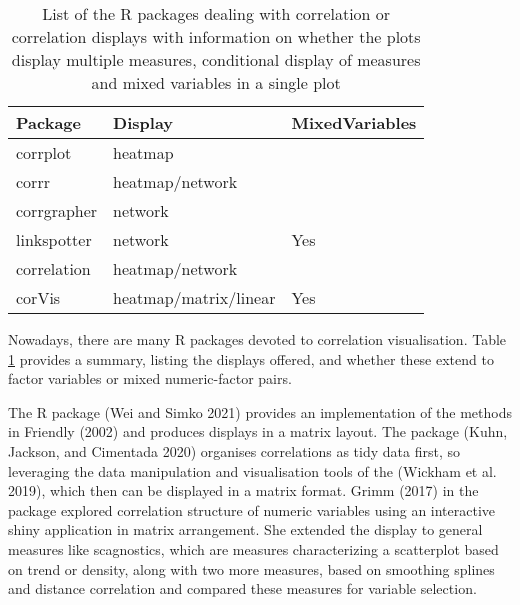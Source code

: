 \begin{table}

\caption{\label{tab:corrdisplay-packages}List of the R packages dealing with correlation or correlation displays with information on whether the plots display multiple measures, conditional display of measures and mixed variables in a single plot}
\centering
\begin{tabular}[t]{lll}
\toprule
Package & Display & MixedVariables\\
\midrule
corrplot & heatmap & \\
corrr & heatmap/network & \\
corrgrapher & network & \\
linkspotter & network & Yes\\
correlation & heatmap/network & \\
\addlinespace
corVis & heatmap/matrix/linear & Yes\\
\bottomrule
\end{tabular}
\end{table}

Nowadays, there are many R packages devoted to correlation visualisation. Table \ref{tab:corrdisplay-packages} provides a summary, listing the displays offered, and whether these extend to factor variables or mixed numeric-factor pairs.

The R package  (Wei and Simko 2021) provides an implementation of the methods in Friendly (2002) and produces displays in a matrix layout. The package  (Kuhn, Jackson, and Cimentada 2020) organises correlations as tidy data first, so leveraging the data manipulation and visualisation tools of the  (Wickham et al. 2019), which then can be displayed in a matrix format. Grimm (2017) in the package  explored correlation structure of numeric variables using an interactive shiny application in matrix arrangement. She extended the display to general measures like scagnostics, which are measures characterizing a scatterplot based on trend or density, along with two more measures, based on smoothing splines and distance correlation and compared these measures for variable selection.


